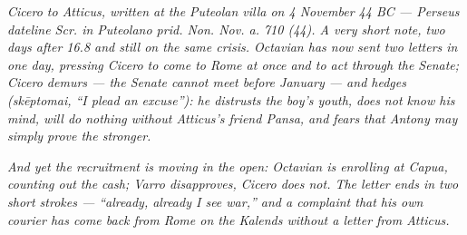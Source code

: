 
\textit{Cicero to Atticus, written at the Puteolan villa on
4 November 44 BC --- Perseus dateline \textit{Scr. in
Puteolano prid. Non. Nov. a. 710 (44)}. A very short note,
two days after 16.8 and still on the same crisis. Octavian
has now sent two letters in one day, pressing Cicero to come
to Rome at once and to act through the Senate; Cicero
demurs --- the Senate cannot meet before January --- and
hedges (\textit{skēptomai}, ``I plead an excuse''): he
distrusts the boy's youth, does not know his mind, will do
nothing without Atticus's friend Pansa, and fears that
Antony may simply prove the stronger.}

\textit{And yet the recruitment is moving in the open:
Octavian is enrolling at Capua, counting out the cash; Varro
disapproves, Cicero does not. The letter ends in two short
strokes --- ``already, already I see war,'' and a complaint
that his own courier has come back from Rome on the Kalends
without a letter from Atticus.}
